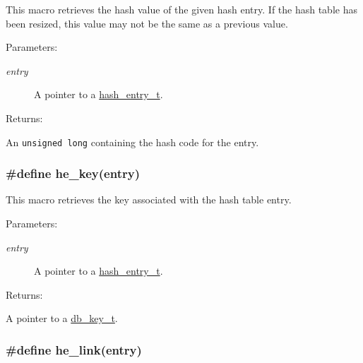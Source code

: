 This macro retrieves the hash value of the given hash entry. If the hash table has been resized, this value may not be the same as a previous value.\begin{Desc}
\item[Parameters: ]\par
\begin{description}
\item[{\em 
entry}]A pointer to a \hyperlink{group__dbprim__hash_a1}{hash\_\-entry\_\-t}.\end{description}
\end{Desc}
\begin{Desc}
\item[Returns: ]\par
An {\tt unsigned long} containing the hash code for the entry. \end{Desc}
\hypertarget{group__dbprim__hash_a35}{
\subsubsection[he\_\-key]{\setlength{\rightskip}{0pt plus 5cm}\#define he\_\-key(entry)}}
\label{group__dbprim__hash_a35}


This macro retrieves the key associated with the hash table entry.\begin{Desc}
\item[Parameters: ]\par
\begin{description}
\item[{\em 
entry}]A pointer to a \hyperlink{group__dbprim__hash_a1}{hash\_\-entry\_\-t}.\end{description}
\end{Desc}
\begin{Desc}
\item[Returns: ]\par
A pointer to a \hyperlink{group__dbprim_a0}{db\_\-key\_\-t}. \end{Desc}
\hypertarget{group__dbprim__hash_a31}{
\subsubsection[he\_\-link]{\setlength{\rightskip}{0pt plus 5cm}\#define he\_\-link(entry)}}
\label{group__dbprim__hash_a31}


